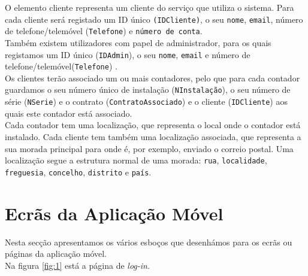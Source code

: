 O elemento cliente representa um cliente do serviço que utiliza o sistema. Para cada cliente será registado um ID único  \texttt{(IDCliente)}, o seu \texttt{nome}, \texttt{email}, número de telefone/telemóvel (\texttt{Telefone}) e \texttt{número de conta}. \\
Também existem utilizadores com papel de administrador, para os quais registamos um ID único (\texttt{IDAdmin}), o seu \texttt{nome}, \texttt{email} e número de telefone/telemóvel(\texttt{Telefone}) . \\
Os clientes terão associado um ou mais contadores, pelo que para cada contador guardamos o seu número único de instalação (\texttt{NInstalação}), o seu número de série (\texttt{NSerie}) e o contrato (\texttt{ContratoAssociado}) e o cliente (\texttt{IDCliente}) aos quais este contador está associado. \\
Cada contador tem uma localização, que representa o local onde o contador está instalado. Cada cliente tem também uma localização associada, que representa a sua morada principal para onde é, por exemplo, enviado o correio postal. Uma localização segue a estrutura normal de uma morada: \texttt{rua}, \texttt{localidade}, \texttt{freguesia}, \texttt{concelho}, \texttt{distrito} e \texttt{país}.

\section{Ecrãs da Aplicação Móvel} \label{sec:ecra}
Nesta secção apresentamos os vários esboços que desenhámos para os ecrãs ou páginas da aplicação móvel.\\
Na figura \ref{fig:1} está a página de \textit{log-in}.

